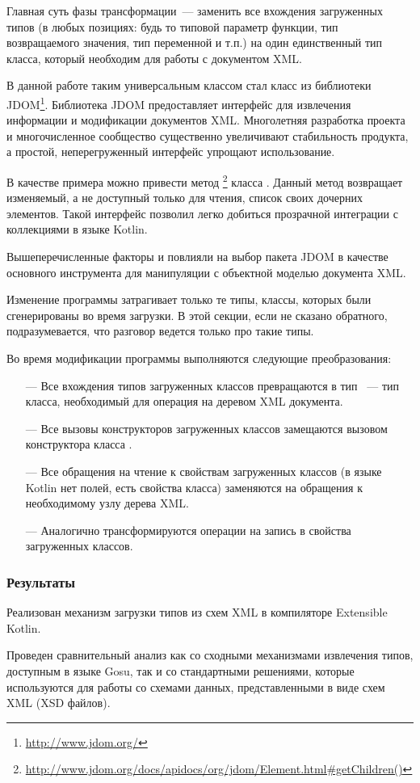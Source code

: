 Главная суть фазы трансформации~--- заменить все вхождения загруженных типов (в любых позициях: будь то типовой параметр функции, тип возвращаемого значения, тип переменной и т.п.) на один единственный тип класса, который необходим для работы с документом XML.

В данной работе таким универсальным классом стал класс  из библиотеки JDOM\footnote{\url{http://www.jdom.org/}}. Библиотека JDOM предоставляет интерфейс для извлечения информации и модификации документов XML. Многолетняя разработка проекта и многочисленное сообщество существенно увеличивают стабильность продукта, а простой, неперегруженный интерфейс упрощают использование.

В качестве примера можно привести метод 
\footnote{\url{http://www.jdom.org/docs/apidocs/org/jdom/Element.html\#getChildren()}} класса .
Данный метод возвращает изменяемый, а не доступный только для чтения, список своих дочерних элементов. Такой интерфейс позволил легко добиться прозрачной интеграции с коллекциями в языке Kotlin.

Вышеперечисленные факторы и повлияли на выбор пакета JDOM в качестве основного инструмента для манипуляции с объектной моделью документа XML.

Изменение программы затрагивает только те типы, классы, которых были сгенерированы во время загрузки. В этой секции, если не сказано обратного, подразумевается, что разговор ведется только про такие типы.

Во время модификации программы выполняются следующие преобразования:
\begin{itemize}
\item[---] Все вхождения типов загруженных классов превращаются в тип ~--- тип класса, необходимый для операция на деревом XML документа.
\item[---] Все вызовы конструкторов загруженных классов замещаются вызовом конструктора класса .
\item[---] Все обращения на чтение к свойствам загруженных классов (в языке Kotlin нет полей, есть свойства класса) заменяются на обращения к необходимому узлу дерева XML.
\item[---] Аналогично трансформируются операции на запись в свойства загруженных классов.
\end{itemize}

\subsubsection{Результаты}
Реализован механизм загрузки типов из схем XML в компиляторе Extensible Kotlin.

Проведен сравнительный анализ как со сходными механизмами извлечения типов, доступным в языке Gosu, так и со стандартными решениями, которые используются для работы со схемами данных, представленными в виде схем XML (XSD файлов).